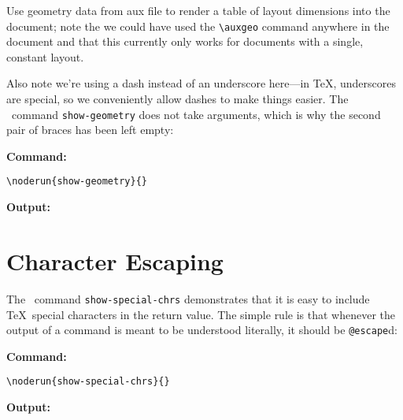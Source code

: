 \documentclass[a5paper]{article}
\begin{document}

\auxgeo

Use geometry data from aux file to render a table of layout dimensions into the document;
note the we could have used the \verb#\auxgeo# command anywhere in the document and that
this currently only works for documents with a single, constant layout.

Also note we're using a dash instead of an underscore here—in \TeX, underscores are special, so
we conveniently allow dashes to make things easier. The \CX\ command \verb#show-geometry# does
not take arguments, which is why the second pair of braces has been left empty:

{\textbf{Command:}}

\verb#\noderun{show-geometry}{}#\par

{\textbf{Output:}}


\clearpage
\section{Character Escaping}
The \CX\ command \verb#show-special-chrs# demonstrates that it is easy to include \TeX\ special characters
in the return value. The simple rule is that whenever the output of a command is meant to be understood
literally, it should be \verb#@escape#d:

{\textbf{Command:}}

\verb#\noderun{show-special-chrs}{}#

{\textbf{Output:}}







\end{document}
